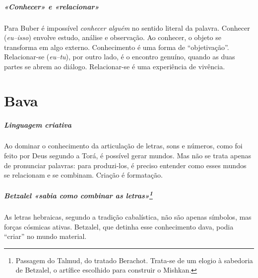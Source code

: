 \paragraph{«Conhecer» e «relacionar»} Para Buber é impossível \textit{conhecer alguém} no sentido literal da palavra. Conhecer (\textit{eu--isso}) envolve estudo, análise e observação. Ao conhecer, o objeto se transforma em algo externo. Conhecimento é uma forma de ``objetivação''. Relacionar-se (\textit{eu--tu}), por outro lado, é o encontro genuíno, quando as duas partes se abrem ao diálogo. Relacionar-se é uma experiência de vivência.

\chapter*{Bava \smallskip{}}

\begin{center}
{\huge{}}
\end{center}


\paragraph{Linguagem criativa} Ao dominar o conhecimento da articulação de letras, sons e números, como foi feito por Deus segundo a Torá, é possível gerar mundos. Mas não se trata apenas de pronunciar palavras: para produzi-los, é preciso entender como esses mundos se relacionam e se combinam. Criação é formatação.

\paragraph{Betzalel «sabia como combinar as letras»\footnote{Passagem do Talmud, do tratado Berachot. Trata-se de um elogio à sabedoria de Betzalel, o artífice escolhido para construir o Mishkan.}} As letras hebraicas, segundo a tradição cabalística, não são apenas símbolos, mas forças cósmicas ativas. Betzalel, que detinha esse conhecimento dava, podia ``criar'' no mundo material.

